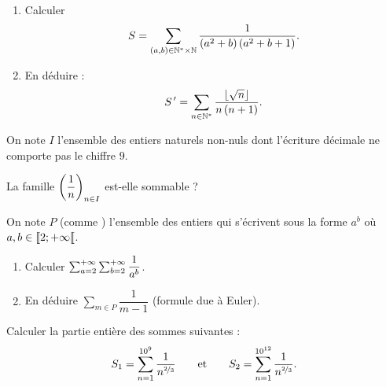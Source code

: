 \begin{exo}[Exercice 22]
\begin{enumerate}
\item Calculer \[S=\sum_{\left(a,b\right)\in\mathbb{N}^*\times\mathbb{N}}\dfrac{1}{\left(a^2+b\right)\left(a^2+b+1\right)}.\]

\item En déduire : \[S^{\,\prime}=\sum_{n\in\mathbb{N}^*}\dfrac{\left\lfloor\sqrt{n}\right\rfloor}{n\left(n+1\right)}.\]
\end{enumerate}
\end{exo}

\begin{corr}
\end{corr}

\begin{exo}[Exercice 23, X MP]
On note \(I\) l'ensemble des entiers naturels non-nuls dont l'écriture décimale ne comporte pas le chiffre \(9\).

La famille \(\left(\dfrac{1}{n}\right)_{n\in I}\) est-elle sommable ?
\end{exo}

\begin{corr}
\end{corr}

\begin{exo}[Exercice 24]
On note \(P\) (comme ) l'ensemble des entiers qui s'écrivent sous la forme \(a^b\) où \(a,b\in\left\llbracket2;+\infty\right\llbracket\).

\begin{enumerate}
\item Calculer \(\sum_{a=2}^{+\infty}\sum_{b=2}^{+\infty}\dfrac{1}{a^b}\). \\

\item En déduire \(\sum_{m\in P}\dfrac{1}{m-1}\) (formule due à Euler).
\end{enumerate}
\end{exo}

\begin{corr}
\end{corr}

\begin{exo}[Exercice 25]
Calculer la partie entière des sommes suivantes : \[S_1=\sum_{n=1}^{10^9}\dfrac{1}{n^{\nicefrac{2}{3}}}\qquad\text{et}\qquad S_2=\sum_{n=1}^{10^{12}}\dfrac{1}{n^{\nicefrac{2}{3}}}.\]
\end{exo}

\begin{corr}
\end{corr}